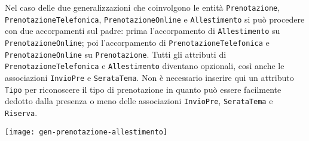 Nel caso delle due generalizzazioni che coinvolgono le entità {\tt Prenotazione},
{\tt PrenotazioneTelefonica}, {\tt PrenotazioneOnline} e {\tt Allestimento} si può
procedere con due accorpamenti sul padre: prima l'accorpamento di {\tt Allestimento}
su {\tt PrenotazioneOnline}; poi l'accorpamento di {\tt PrenotazioneTelefonica} e
{\tt PrenotazioneOnline} su {\tt Prenotazione}. Tutti gli attributi di {\tt PrenotazioneTelefonica}
e {\tt Allestimento} diventano opzionali, così anche le associazioni {\tt InvioPre}
e {\tt SerataTema}. Non è necessario inserire qui un attributo {\tt Tipo} per riconoscere
il tipo di prenotazione in quanto può essere facilmente dedotto dalla presenza o meno delle
associazioni {\tt InvioPre}, {\tt SerataTema} e {\tt Riserva}.

\vspace{5pt}\centerline{\texttt{[image: gen-prenotazione-allestimento]}}
